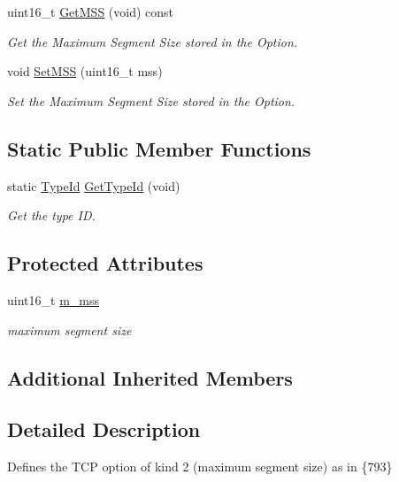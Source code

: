 \begin{DoxyCompactItemize}
uint16\+\_\+t \hyperlink{classns3_1_1TcpOptionMSS_aa97673214d1f1f7a7202d8e0cd6700e0}{Get\+M\+SS} (void) const 
\begin{DoxyCompactList}\small\item\em Get the Maximum Segment Size stored in the Option. \end{DoxyCompactList}\item 
void \hyperlink{classns3_1_1TcpOptionMSS_a37e70e6d3652f2e718b35d3c19cc1896}{Set\+M\+SS} (uint16\+\_\+t mss)
\begin{DoxyCompactList}\small\item\em Set the Maximum Segment Size stored in the Option. \end{DoxyCompactList}\end{DoxyCompactItemize}
\subsection*{Static Public Member Functions}
\begin{DoxyCompactItemize}
\item 
static \hyperlink{classns3_1_1TypeId}{Type\+Id} \hyperlink{classns3_1_1TcpOptionMSS_aaec9dfb07153afa27d71d2deeda43f86}{Get\+Type\+Id} (void)
\begin{DoxyCompactList}\small\item\em Get the type ID. \end{DoxyCompactList}\end{DoxyCompactItemize}
\subsection*{Protected Attributes}
\begin{DoxyCompactItemize}
\item 
uint16\+\_\+t \hyperlink{classns3_1_1TcpOptionMSS_a247a7e4a1b78a1ffc5ab5a5d00645e88}{m\+\_\+mss}
\begin{DoxyCompactList}\small\item\em maximum segment size \end{DoxyCompactList}\end{DoxyCompactItemize}
\subsection*{Additional Inherited Members}


\subsection{Detailed Description}
Defines the T\+CP option of kind 2 (maximum segment size) as in \{793\} 

